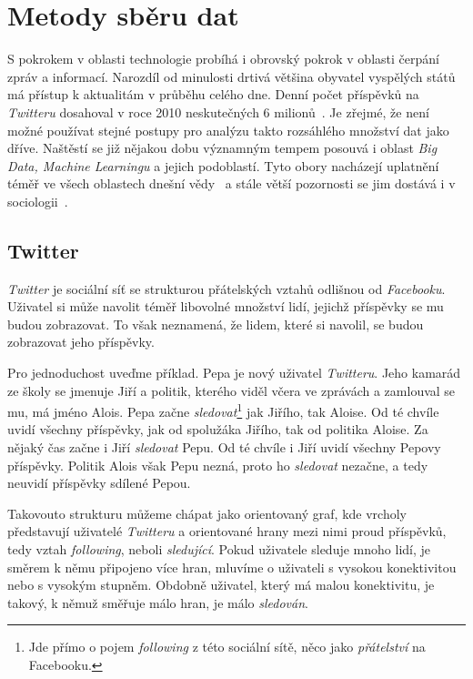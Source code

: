 \documentclass[12pt, a4paper]{article}
\numberwithin{equation}{section} 	%
\begin{document}
\newpage
\section{Metody sběru dat}
\noindent S pokrokem v oblasti technologie probíhá i obrovský pokrok v oblasti čerpání zpráv a informací. Narozdíl od minulosti drtivá většina obyvatel vyspělých států má přístup k aktualitám v průběhu celého dne. Denní počet příspěvků na \textit{Twitteru} dosahoval v roce 2010 neskutečných 6 milionů~\cite{Mathioudakis2010}. Je zřejmé, že není možné používat stejné postupy pro analýzu takto rozsáhlého množství dat jako dříve. Naštěstí se již nějakou dobu významným tempem posouvá i oblast \textit{Big Data, Machine Learningu} a jejich podoblastí. Tyto obory nacházejí uplatnění téměř ve všech oblastech dnešní vědy~\cite{Huberman2012-2-15} a stále větší pozornosti se jim dostává i v sociologii~\cite{Tinati2014, McFarland2016, Shah2015-04-09}.


\subsection{Twitter}
\noindent\textit{Twitter} je sociální síť se strukturou přátelských vztahů odlišnou od \textit{Facebooku}. Uživatel si může navolit téměř libovolné množství lidí, jejichž příspěvky se mu budou zobrazovat. To však neznamená, že lidem, které si navolil, se budou zobrazovat jeho příspěvky.

Pro jednoduchost uveďme příklad. Pepa je nový uživatel \textit{Twitteru}. Jeho kamarád ze školy se jmenuje Jiří a politik, kterého viděl včera ve zprávách a zamlouval se mu, má jméno Alois. Pepa začne \textit{sledovat}\footnote{Jde přímo o pojem \textit{following} z této sociální sítě, něco jako \textit{přátelství} na Facebooku.} jak Jiřího, tak Aloise. Od té chvíle uvidí všechny příspěvky, jak od spolužáka Jiřího, tak od politika Aloise. Za nějaký čas začne i Jiří \textit{sledovat} Pepu. Od té chvíle i Jiří uvidí všechny Pepovy příspěvky. Politik Alois však Pepu nezná, proto ho \textit{sledovat} nezačne, a tedy neuvidí příspěvky sdílené Pepou.

Takovouto strukturu můžeme chápat jako orientovaný graf, kde vrcholy před\-sta\-vu\-jí uživatelé \textit{Twitteru} a orientované hrany mezi nimi proud příspěvků, tedy vztah \textit{following}, neboli \textit{sledující}. Pokud uživatele sleduje mnoho lidí, je směrem k němu připojeno více hran, mluvíme o uživateli s vysokou konektivitou nebo s vysokým stupněm. Obdobně uživatel, který má malou konektivitu, je takový, k němuž směřuje málo hran, je málo \textit{sledován}.
\end{document}
